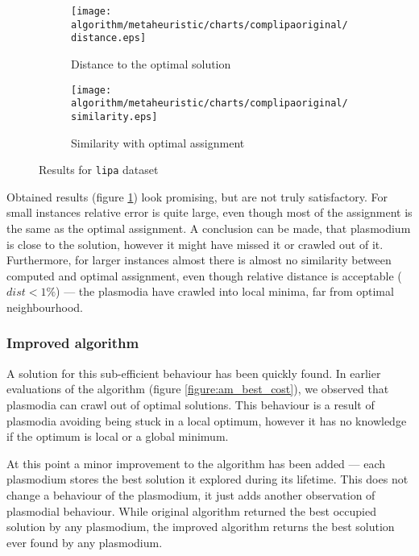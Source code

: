 \begin{figure}
  \centering

  \begin{subfigure}{0.47\textwidth}
    \texttt{[image: algorithm/metaheuristic/charts/complipaoriginal/distance.eps]}
    \caption{Distance to the optimal solution}
  \end{subfigure}
  \begin{subfigure}{0.47\textwidth}
    \texttt{[image: algorithm/metaheuristic/charts/complipaoriginal/similarity.eps]}
    \caption{Similarity with optimal assignment}
  \end{subfigure}
  
  \caption{Results for \texttt{lipa} dataset}
  \label{figure:am_lipa_results}
\end{figure}

Obtained results (figure \ref{figure:am_lipa_results}) look promising, but are not truly satisfactory. For small instances relative error is quite large, even though most of the assignment is the same as the optimal assignment. A conclusion can be made, that plasmodium is close to the solution, however it might have missed it or crawled out of it. Furthermore, for larger instances almost there is almost no similarity between computed and optimal assignment, even though relative distance is acceptable ($dist < 1\%$) --- the plasmodia have crawled into local minima, far from optimal neighbourhood.

\subsubsection{Improved algorithm}

A solution for this sub-efficient behaviour has been quickly found. In earlier evaluations of the algorithm (figure \ref{figure:am_best_cost}), we observed that plasmodia can crawl out of optimal solutions. This behaviour is a result of plasmodia avoiding being stuck in a local optimum, however it has no knowledge if the optimum is local or a global minimum. 

At this point a minor improvement to the algorithm has been added --- each plasmodium stores the best solution it explored during its lifetime. This does not change a behaviour of the plasmodium, it just adds another observation of plasmodial behaviour. While original algorithm returned the best occupied solution by any plasmodium, the improved algorithm returns the best solution ever found by any plasmodium.

